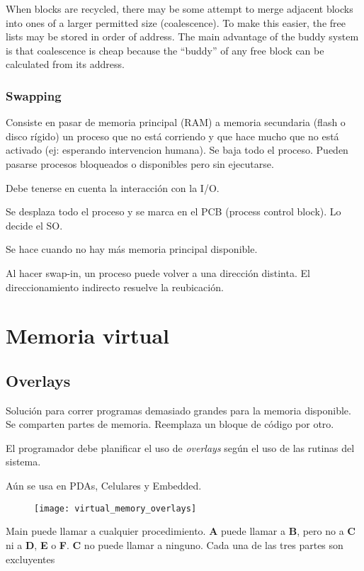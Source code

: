 \documentclass[a4paper, twoside]{article}
\begin{document}
When blocks are recycled, there may be some attempt to merge adjacent blocks into ones of a larger permitted size (coalescence). To make this easier, the free lists may be stored in order of address. The main advantage of the buddy system is that coalescence is cheap because the “buddy” of any free block can be calculated from its address.

\subsubsection{Swapping}
Consiste en pasar de memoria principal (RAM) a memoria secundaria (flash o disco rígido) un proceso que no está corriendo y que hace mucho que no está activado (ej: esperando intervencion humana). Se baja todo el proceso. Pueden pasarse procesos bloqueados o disponibles pero sin ejecutarse.

Debe tenerse en cuenta la interacción con la I/O.

Se desplaza todo el proceso y se marca en el PCB (process control block). Lo decide el SO.

Se hace cuando no hay más memoria principal disponible. 

Al hacer swap-in, un proceso puede volver a una dirección distinta. El direccionamiento indirecto resuelve la reubicación.

\newpage
\section{Memoria virtual}
\subsection{Overlays}
Solución para correr programas demasiado grandes para la memoria disponible. Se comparten partes de memoria.
Reemplaza un bloque de código por otro.

El programador debe planificar el uso de \emph{overlays} según el uso de las rutinas del sistema.

Aún se usa en PDAs, Celulares y Embedded.

\begin{figure}[H]
	\centering
	\texttt{[image: virtual\_memory\_overlays]}
	\label{fig:virtual_memory_overlays}
\end{figure}

Main puede llamar a cualquier procedimiento.
\textbf{A} puede llamar a \textbf{B}, pero no a \textbf{C} ni a \textbf{D}, \textbf{E} o \textbf{F}. \textbf{C} no puede llamar a ninguno.
Cada una de las tres partes son excluyentes
\end{document}
